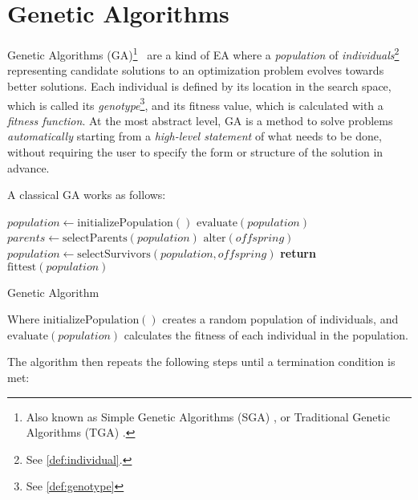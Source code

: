 \section{Genetic Algorithms}
\label{sec:genetic_algorithms}
  Genetic Algorithms (GA)\footnote{
    Also known as Simple Genetic Algorithms (SGA) 
    \autocite{yuIntroductionEvolutionaryAlgorithms2010}, or Traditional Genetic Algorithms (TGA)
    \autocite{shiffmanNatureCode2012}.
  }~\autocite{hollandAdaptationNaturalArtificial1992a,kozaGeneticProgrammingProgramming1992a,yuIntroductionEvolutionaryAlgorithms2010,shiffmanNatureCode2012}
  are a kind of EA where a \emph{population} of \emph{individuals}\footnote{
    See \vref{def:individual}.
  } representing candidate solutions to an optimization problem evolves towards better solutions.
  Each individual is defined by its location in the search space, which is called its
  \emph{genotype}\footnote{See \vref{def:genotype}}, and its fitness value, which is
  calculated with a \emph{fitness function}.
  At the most abstract level, GA is a method to solve problems \textit{automatically} starting from 
  a \textit{high-level statement} of what needs to be done, without requiring the user to specify
  the form or structure of the solution in advance.

  A classical GA works as follows:

  \begin{algorithm}
    \begin{algorithmic}[1]
      \State \(\mathit{population} \gets \mathrm{initializePopulation()}\)
      \State \(\mathrm{evaluate}(\mathit{population})\)
      \Repeat
        \State \(\mathit{parents} \gets \mathrm{selectParents}(\mathit{population})\)
        \State \(\mathrm{alter}(\mathit{offspring})\)
        \State \(\mathit{population} \gets \mathrm{selectSurvivors}(\mathit{population},
          \mathit{offspring})\)
      \State \textbf{return} \(\mathrm{fittest}(\mathit{population})\)
    \end{algorithmic}
    \caption{Genetic Algorithm}
    \label{alg:genetic_algorithm}
  \end{algorithm}

  Where \(\mathrm{initializePopulation()}\) creates a random population of individuals, and
  \(\mathrm{evaluate}(\mathit{population})\) calculates the fitness of each individual in the
  population.

  The algorithm then repeats the following steps until a termination condition is met:

